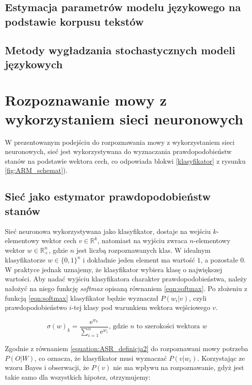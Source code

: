 \documentclass[11pt]{article}
\newcommand{\refBlock}[1]{%
	\hyperref[#1]{\ref*{#1}}%
}
\begin{document}
    \subsection{ Estymacja parametrów modelu językowego na podstawie korpusu tekstów }
    \subsection{ Metody wygładzania stochastycznych modeli językowych }


\section{Rozpoznawanie mowy z wykorzystaniem sieci neuronowych}
	\label{sec:ASR_NN}
	W prezentowanym podejściu do rozpoznawania mowy z wykorzystaniem sieci neuronowych, sieć jest wykorzystywana do wyznaczania prawdopodobieństw stanów na podstawie wektora cech, co odpowiada blokwi \refBlock{klasyfikator} z rysunku \ref{fig:ARM_schemat}).
	
	\subsection{Sieć jako estymator prawdopodobieństw stanów }
	\label{sec:nn_estymator}
		Sieć neuronowa wykorzystywana jako klasyfikator, dostaje na wejściu $k$-elementowy wektor cech $v \in \mathbb{R}^k$, natomiast na wyjściu zwraca $n$-elementowy wektor $w \in \mathbb{R}_+^n$, gdzie $n$ jest liczbą rozpoznawanych klas. W idealnym klasyfikatorze $w \in \{0,1\}^n$ i dokładnie jeden element ma wartość $1$, a pozostałe $0$. W praktyce jednak uznajemy, że klasyfikator wybiera klasę o największej wartości. Aby nadać wyjściu klasyfikatora charakter prawdopodobieństwa, należy nałożyć na niego funkcję \textit{softmax} opisaną równaniem \ref{eqn:softmax}. Po złożeniu z funkcją \ref{eqn:softmax} klasyfikator będzie wyznaczał $P(w_i|v)$, czyli prawdopodobieństwo $i$-tej klasy pod warunkiem wektora wejściowego $v$.
		
		\begin{equation}
			\sigma(w)_k=\frac{\mathrm{e}^{w_k}}{\sum_{i=1}^{n} \mathrm{e}^{w_i}}
			\text{,   gdzie $n$ to szerokości wektora $w$}
			\label{eqn:softmax}
		\end{equation}
		
		Zgodnie z równaniem \ref{equation:ASR_definicja2} do rozpoznawani mowy potrzeba $P(O|W)$, co oznacza, że klasyfikator musi wyznaczać $P(v|w_i)$. Korzystając ze wzoru Bayes i obserwacji, że $P(v)$ nie ma wpływu na rozpoznawanie, gdyż jest takie samo dla wszystkich hipotez, otrzymujemy:
		
\end{document}

